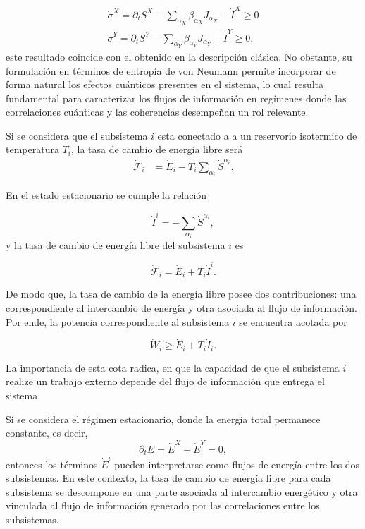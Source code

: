 \begin{align*}
    \dot{\sigma}^{X} = \partial_{t}S^{X} - \sum_{\alpha_{X}} \beta_{\alpha_{X}} J_{\alpha_{X}} - \dot{I}^{X} \geq 0 \\
    \dot{\sigma}^{Y} = \partial_{t}S^{Y} - \sum_{\alpha_{Y}} \beta_{\alpha_{Y}} J_{\alpha_{Y}} - \dot{I}^{Y} \geq 0,
\end{align*}
este resultado coincide con el obtenido en la descripción clásica. No obstante, su formulación en términos de entropía de von Neumann permite incorporar de forma natural los efectos cuánticos presentes en el sistema, lo cual resulta fundamental para caracterizar los flujos de información en regímenes donde las correlaciones cuánticas y las coherencias desempeñan un rol relevante.

Si se considera que el subsistema $i$ esta conectado a a un reservorio isotermico de temperatura $T_i$, la tasa de cambio de energía libre será
\begin{align*}
    \dot{\mathcal{F}}_{i} & = \dot{E}_{i} - T_{i} \sum_{\alpha_{i}}\dot{S}^{\alpha_{i}}. 
\end{align*}

En el estado estacionario se cumple la relación

\begin{equation*}
    \dot{I}^{i} = - \sum_{\alpha_{i}}\dot{S}^{\alpha_{i}},
\end{equation*}
y la tasa de cambio de energía libre del subsistema $i$ es 

\begin{equation*}
    \dot{\mathcal{F}}_{i} = \dot{E}_{i} + T_{i} \dot{I}^{i}.
\end{equation*}

De modo que, la tasa de cambio de la energía libre posee dos contribuciones: una correspondiente al intercambio de energía y otra asociada al flujo de información. Por ende, la potencia correspondiente al subsistema $i$ se encuentra acotada por

\begin{equation*}
    \dot{W}_{i} \geq \dot{E}_{i} + T_{i}\dot{I}_{i}.
\end{equation*}

La importancia de esta cota radica, en que la capacidad de que el subsistema $i$ realize un trabajo externo depende del flujo de información que entrega el sistema.

Si se considera el régimen estacionario, donde la energía total permanece constante, es decir,
\begin{equation*}
    \partial_{t}E = \dot{E}^{X} + \dot{E}^{Y} = 0,
\end{equation*}
entonces los términos $\dot{E}^{i}$ pueden interpretarse como flujos de energía entre los dos subsistemas. En este contexto, la tasa de cambio de energía libre para cada subsistema se descompone en una parte asociada al intercambio energético y otra vinculada al flujo de información generado por las correlaciones entre los subsistemas.


